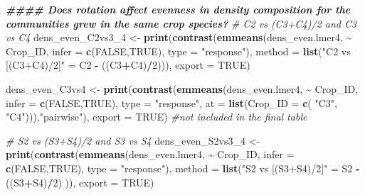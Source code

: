 \documentclass[
]{article}
\newenvironment{Shaded}{\begin{snugshade}}{\end{snugshade}}
\newcommand{\AttributeTok}[1]{\textcolor[rgb]{0.13,0.29,0.53}{#1}}
\newcommand{\CommentTok}[1]{\textcolor[rgb]{0.56,0.35,0.01}{\textit{#1}}}
\newcommand{\ConstantTok}[1]{\textcolor[rgb]{0.56,0.35,0.01}{#1}}
\newcommand{\DecValTok}[1]{\textcolor[rgb]{0.00,0.00,0.81}{#1}}
\newcommand{\DocumentationTok}[1]{\textcolor[rgb]{0.56,0.35,0.01}{\textbf{\textit{#1}}}}
\newcommand{\FunctionTok}[1]{\textcolor[rgb]{0.13,0.29,0.53}{\textbf{#1}}}
\newcommand{\NormalTok}[1]{#1}
\newcommand{\OtherTok}[1]{\textcolor[rgb]{0.56,0.35,0.01}{#1}}
\newcommand{\SpecialCharTok}[1]{\textcolor[rgb]{0.81,0.36,0.00}{\textbf{#1}}}
\newcommand{\StringTok}[1]{\textcolor[rgb]{0.31,0.60,0.02}{#1}}
\begin{document}
\begin{Shaded}
\begin{Highlighting}[]
\DocumentationTok{\#\#\#\# Does rotation affect evenness in density composition for the communities grew in the same crop species?  }
\CommentTok{\# C2 vs (C3+C4)/2 and C3 vs C4}
\NormalTok{dens\_even\_C2vs3\_4 }\OtherTok{\textless{}{-}} \FunctionTok{print}\NormalTok{(}\FunctionTok{contrast}\NormalTok{(}\FunctionTok{emmeans}\NormalTok{(dens\_even.lmer4, }\SpecialCharTok{\textasciitilde{}}\NormalTok{ Crop\_ID,}
                                            \AttributeTok{infer =} \FunctionTok{c}\NormalTok{(}\ConstantTok{FALSE}\NormalTok{,}\ConstantTok{TRUE}\NormalTok{), }
                                            \AttributeTok{type =} \StringTok{"response"}\NormalTok{), }
                                    \AttributeTok{method =} \FunctionTok{list}\NormalTok{(}\StringTok{"C2 vs [(C3+C4)/2]"} \OtherTok{=}\NormalTok{ C2 }\SpecialCharTok{{-}}\NormalTok{ ((C3}\SpecialCharTok{+}\NormalTok{C4)}\SpecialCharTok{/}\DecValTok{2}\NormalTok{))),}
                           \AttributeTok{export =} \ConstantTok{TRUE}\NormalTok{)}

\NormalTok{dens\_even\_C3vs4 }\OtherTok{\textless{}{-}} \FunctionTok{print}\NormalTok{(}\FunctionTok{contrast}\NormalTok{(}\FunctionTok{emmeans}\NormalTok{(dens\_even.lmer4, }\SpecialCharTok{\textasciitilde{}}\NormalTok{ Crop\_ID,}
                                          \AttributeTok{infer =} \FunctionTok{c}\NormalTok{(}\ConstantTok{FALSE}\NormalTok{,}\ConstantTok{TRUE}\NormalTok{),}
                                          \AttributeTok{type =} \StringTok{"response"}\NormalTok{, }
                                          \AttributeTok{at =} \FunctionTok{list}\NormalTok{(}\AttributeTok{Crop\_ID =} \FunctionTok{c}\NormalTok{( }\StringTok{"C3"}\NormalTok{, }\StringTok{"C4"}\NormalTok{))),}\StringTok{"pairwise"}\NormalTok{),}
                         \AttributeTok{export =} \ConstantTok{TRUE}\NormalTok{) }\CommentTok{\#not included in the final table}

\CommentTok{\# S2 vs (S3+S4)/2 and S3 vs S4}
\NormalTok{dens\_even\_S2vs3\_4 }\OtherTok{\textless{}{-}} \FunctionTok{print}\NormalTok{(}\FunctionTok{contrast}\NormalTok{(}\FunctionTok{emmeans}\NormalTok{(dens\_even.lmer4, }\SpecialCharTok{\textasciitilde{}}\NormalTok{ Crop\_ID, }
                                            \AttributeTok{infer =} \FunctionTok{c}\NormalTok{(}\ConstantTok{FALSE}\NormalTok{,}\ConstantTok{TRUE}\NormalTok{),}
                                            \AttributeTok{type =} \StringTok{"response"}\NormalTok{),}
                                    \AttributeTok{method =} \FunctionTok{list}\NormalTok{(}\StringTok{"S2 vs [(S3+S4)/2]"} \OtherTok{=}\NormalTok{ S2 }\SpecialCharTok{{-}}\NormalTok{ ((S3}\SpecialCharTok{+}\NormalTok{S4)}\SpecialCharTok{/}\DecValTok{2}\NormalTok{) )),}
                           \AttributeTok{export =} \ConstantTok{TRUE}\NormalTok{)}


\end{Highlighting}
\end{Shaded}
\end{document}
